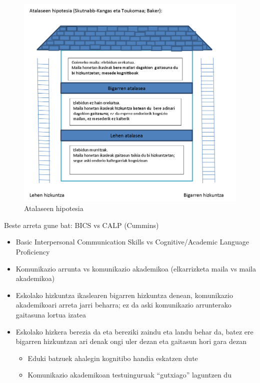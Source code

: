 \documentclass[
]{book}
\providecommand{\tightlist}{%
  \setlength{\itemsep}{0pt}\setlength{\parskip}{0pt}}
\begin{document}
\begin{figure}
\centering
\includegraphics{assets/2-image3.png}
\caption{Atalaseen hipotesia}
\end{figure}

Beste arreta gune bat: BICS vs CALP (Cummins)

\begin{itemize}
\tightlist
\item
  Basic Interpersonal Communication Skills vs Cognitive/Academic Language Proficiency
\item
  Komunikazio arrunta vs komunikazio akademikoa (elkarrizketa maila vs maila akademikoa)
\item
  Eskolako hizkuntza ikaslearen bigarren hizkuntza denean, komunikazio akademikoari arreta jarri beharra; ez da aski komunikazio arrunterako gaitasuna lortua izatea
\item
  Eskolako hizkera berezia da eta bereziki zaindu eta landu behar da, batez ere bigarren hizkuntzan ari denak ongi uler dezan eta gaitasun hori gara dezan

  \begin{itemize}
  \tightlist
  \item
    Eduki batzuek ahalegin kognitibo handia eskatzen dute
  \item
    Komunikazio akademikoan testuinguruak ``gutxiago'' laguntzen du
  \end{itemize}
\end{itemize}
\end{document}
